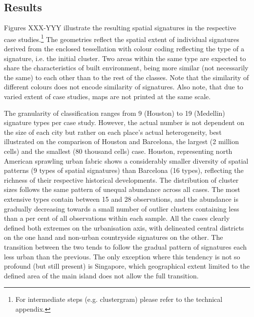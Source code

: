 \subsection{Results}

Figures XXX-YYY illustrate the resulting spatial signatures in the respective case
studies.\footnote{For intermediate steps (e.g. clustergram) please refer to the
technical appendix.} The geometries reflect the spatial extent of individual
signatures derived from the enclosed tessellation
with colour coding reflecting the type of a signature, i.e. the initial cluster. Two
areas within the same type are expected to share the characteristics of built
environment, being more similar (not necessarily the same) to each other than to
the rest of the classes. Note that the similarity of different colours does not
encode similarity of signatures. Also note, that due to varied extent of case studies,
maps are not printed at the same scale.

The granularity of classification ranges from 9 (Houston) to 19 (Medellin)
signature types per case study. However, the actual number is not dependent on
the size of each city but rather on each place's actual heterogeneity, best
illustrated on the comparison of Houston and Barcelona, the largest (2 million
cells) and the smallest (80 thousand cells) case. Houston, representing north
American sprawling urban fabric shows a considerably smaller diversity of
spatial patterns (9 types of spatial signatures) than Barcelona (16 types),
reflecting the richness of their respective historical developments.
The distribution of cluster sizes follows the same pattern of unequal abundance
across all cases. The most extensive types contain between 15 and 28%
observations, and the abundance is gradually decreasing towards a small number
of outlier clusters containing less than a per cent of all observations within
each sample.
All the cases clearly defined both extremes on the urbanisation axis, with
delineated central districts on the one hand and non-urban countryside
signatures on the other. The transition between the two tends to follow the
gradual pattern of signatures each less urban than the previous. The only
exception where this tendency is not so profound (but still present) is
Singapore, which geographical extent limited to the defined area of the main
island does not allow the full transition.



